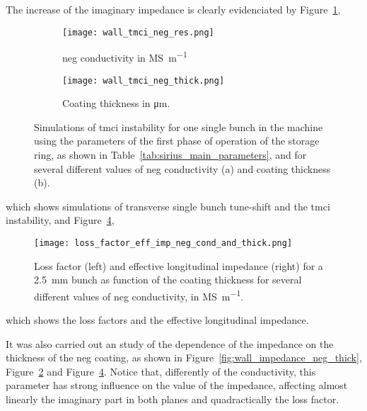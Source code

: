     The increase of the imaginary impedance is clearly evidenciated by Figure~\ref{fig:wall_tmci_neg_res},
    \begin{figure}[t!]
        \centering
        \begin{subfigure}[c]{0.49\textwidth}
            \texttt{[image: wall\_tmci\_neg\_res.png]}
            \caption{\gls{neg} conductivity in \si{\mega\siemens\per\meter}}
            \label{fig:wall_tmci_neg_res}
            \end{subfigure}\hfill
            \begin{subfigure}[c]{0.49\textwidth}
                \texttt{[image: wall\_tmci\_neg\_thick.png]}
                \caption{Coating thickness in \si{\micro\meter}.}
                \label{fig:wall_tmci_neg_thick}
            \end{subfigure}
            \caption[Effect of NEG on TMCI]{Simulations of \gls{tmci} instability for one single bunch in the machine using the parameters of the first phase of operation of the storage ring, as shown in Table~\ref{tab:sirius_main_parameters}, and for several different values of \gls{neg} conductivity (a) and coating thickness (b).}
            \label{fig:wall_tmci_neg}
        \end{figure}
    which shows simulations of transverse single bunch tune-shift and the \gls{tmci} instability, and Figure~\ref{fig:wall_loss_facttor_eff_imp_cond_thick},
    \begin{figure}
        \centering
        \texttt{[image: loss\_factor\_eff\_imp\_neg\_cond\_and\_thick.png]}
        \caption[Effect of NEG on loss factor and effective longitudinal impedance]{Loss factor (left) and effective longitudinal impedance (right) for a \SI{2.5}{\milli\meter} bunch as function of the coating thickness for several different values of \gls{neg} conductivity, in \si{\mega\siemens\per\meter}.}
        \label{fig:wall_loss_facttor_eff_imp_cond_thick}
    \end{figure}
    which shows the loss factors and the effective longitudinal impedance.

    It was also carried out an study of the dependence of the impedance on the thickness of the \gls{neg} coating, as shown in Figure~\ref{fig:wall_impedance_neg_thick}, Figure~\ref{fig:wall_tmci_neg_thick} and Figure~\ref{fig:wall_loss_facttor_eff_imp_cond_thick}. Notice that, differently of the conductivity, this parameter has strong influence on the value of the impedance, affecting almost linearly the imaginary part in both planes and quadractically the loss factor.

